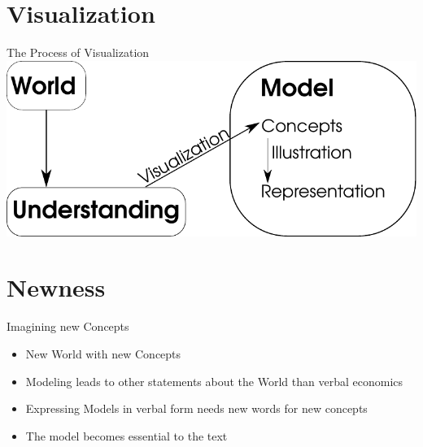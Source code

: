\documentclass[ucs]{beamer}\usepackage[]{graphicx}\usepackage[]{color}
\begin{document}
\section{Visualization}
\begin{frame}{The Process of Visualization}
\includegraphics[scale = 0.8]{ImagingImaginingDiagramm.pdf}	
\end{frame}

\section{Newness}
\begin{frame}{Imagining new Concepts}
\begin{itemize}
\item New World with new Concepts
\item Modeling leads to other statements about the World than verbal economics
\item Expressing Models in verbal form needs new words for new concepts
\item The model becomes essential to the text
\end{itemize}
\end{frame}
\end{document}
